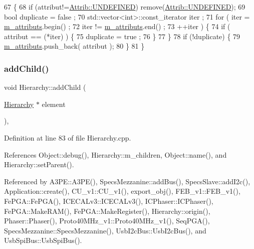 \begin{DoxyCode}
67                             \{
68     \textcolor{keywordflow}{if} (attribut!=\hyperlink{classAttrib_a69e171d7cc6417835a5a306d3c764235a3a8da2ab97dda18aebab196fe4100531}{Attrib::UNDEFINED}) \textcolor{keyword}{remove}(\hyperlink{classAttrib_a69e171d7cc6417835a5a306d3c764235a3a8da2ab97dda18aebab196fe4100531}{Attrib::UNDEFINED});
69     \textcolor{keywordtype}{bool} duplicate = false ;
70     std::vector<int>::const\_iterator iter ;
71     \textcolor{keywordflow}{for} ( iter  = \hyperlink{classAttrib_ac4bd58a0cc6b38a3b711d609a3d3aacc}{m\_attributs}.begin() ;
72           iter != \hyperlink{classAttrib_ac4bd58a0cc6b38a3b711d609a3d3aacc}{m\_attributs}.end()   ;
73           ++iter ) \{
74       \textcolor{keywordflow}{if} ( attribut == (*iter) ) \{
75         duplicate = true ;
76       \}
77     \}
78     \textcolor{keywordflow}{if} (!duplicate) \{
79       \hyperlink{classAttrib_ac4bd58a0cc6b38a3b711d609a3d3aacc}{m\_attributs}.push\_back( attribut );
80     \}
81   \}
\end{DoxyCode}
\mbox{\label{classHierarchy_ad677774ff38fcb257c04a3a10d471fac}} 
\subsubsection{\texorpdfstring{add\+Child()}{addChild()}}
{\footnotesize\ttfamily void Hierarchy\+::add\+Child (\begin{DoxyParamCaption}\item[{\hyperlink{classHierarchy}{Hierarchy} $\ast$}]{element }\end{DoxyParamCaption})\hspace{0.3cm}{\ttfamily [virtual]}, {\ttfamily [inherited]}}



Definition at line 83 of file Hierarchy.\+cpp.



References Object\+::debug(), Hierarchy\+::m\+\_\+children, Object\+::name(), and Hierarchy\+::set\+Parent().



Referenced by A3\+P\+E\+::\+A3\+P\+E(), Specs\+Mezzanine\+::add\+Bus(), Specs\+Slave\+::add\+I2c(), Application\+::create(), C\+U\+\_\+v1\+::\+C\+U\+\_\+v1(), export\+\_\+obj(), F\+E\+B\+\_\+v1\+::\+F\+E\+B\+\_\+v1(), Fe\+P\+G\+A\+::\+Fe\+P\+G\+A(), I\+C\+E\+C\+A\+Lv3\+::\+I\+C\+E\+C\+A\+Lv3(), I\+C\+Phaser\+::\+I\+C\+Phaser(), Fe\+P\+G\+A\+::\+Make\+R\+A\+M(), Fe\+P\+G\+A\+::\+Make\+Register(), Hierarchy\+::origin(), Phaser\+::\+Phaser(), Proto40\+M\+Hz\+\_\+v1\+::\+Proto40\+M\+Hz\+\_\+v1(), Seq\+P\+G\+A(), Specs\+Mezzanine\+::\+Specs\+Mezzanine(), Usb\+I2c\+Bus\+::\+Usb\+I2c\+Bus(), and Usb\+Spi\+Bus\+::\+Usb\+Spi\+Bus().



